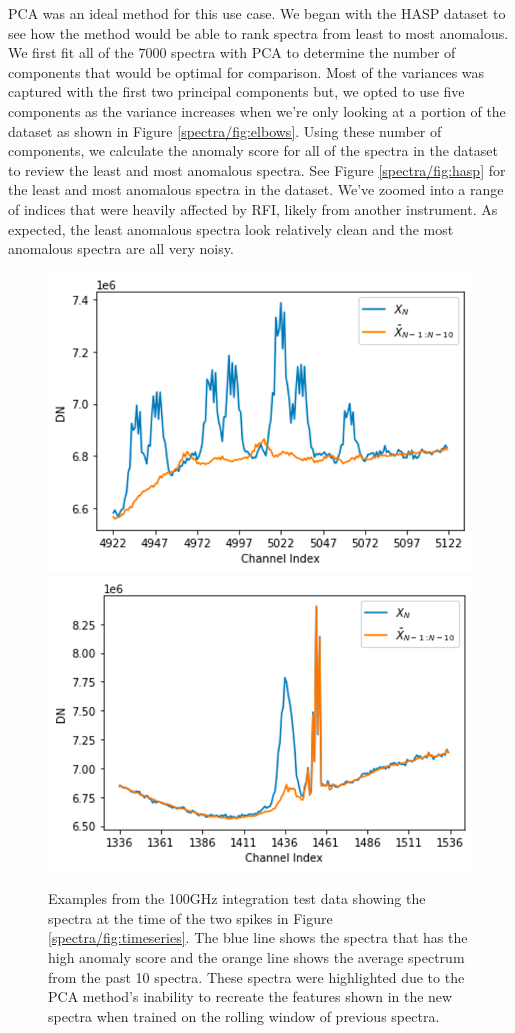 PCA was an ideal method for this use case. 
We began with the HASP dataset to see how the method would be able to rank spectra from least to most anomalous.
We first fit all of the $7000$ spectra with PCA to determine the number of components that would be optimal for comparison.
Most of the variances was captured with the first two principal components but, we opted to use five components as the variance increases when we're only looking at a portion of the dataset as shown in Figure \ref{spectra/fig:elbows}.
Using these number of components, we calculate the anomaly score for all of the spectra in the dataset to review the least and most anomalous spectra. 
See Figure \ref{spectra/fig:hasp} for the least and most anomalous spectra in the dataset. 
We've zoomed into a range of indices that were heavily affected by RFI, likely from another instrument. 
As expected, the least anomalous spectra look relatively clean and the most anomalous spectra are all very noisy. 

\begin{figure}[t]
    \centering
    \includegraphics[width=0.49\linewidth]{figs/spectra/pca1.png}
    \includegraphics[width=0.49\linewidth]{figs/spectra/pca2.png}
    \caption{Examples from the 100GHz integration test data showing the spectra at the time of the two spikes in Figure \ref{spectra/fig:timeseries}. The blue line shows the spectra that has the high anomaly score and the orange line shows the average spectrum from the past 10 spectra. These spectra were highlighted due to the PCA method's inability to recreate the features shown in the new spectra when trained on the rolling window of previous spectra.}
    \label{spectra/fig:100ghz}
\end{figure}

